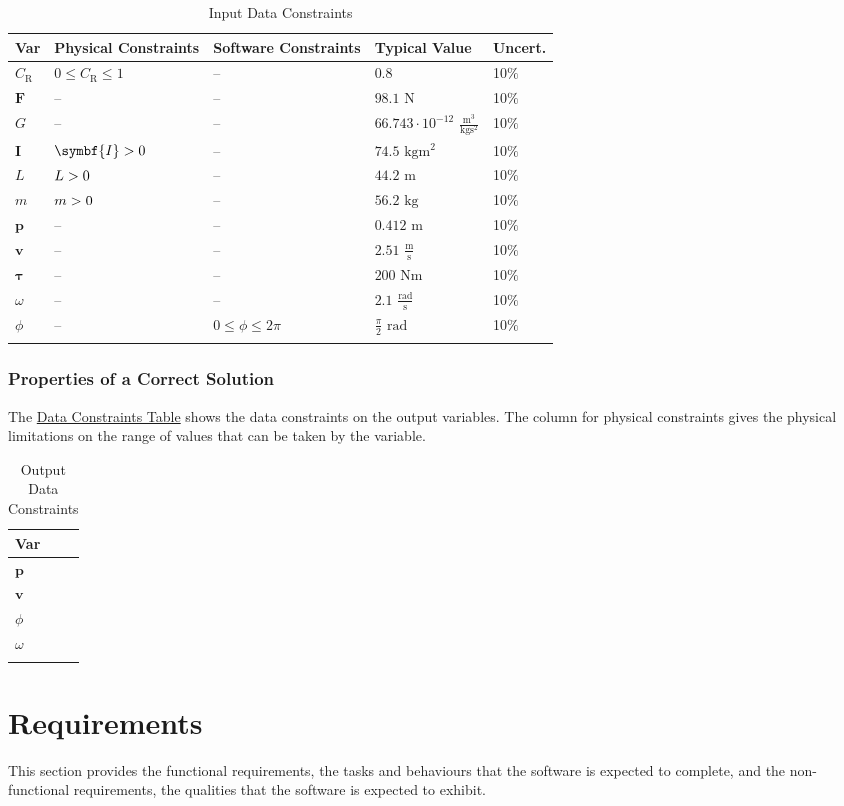 \documentclass[12pt]{article}
\newcommand{\gt}{\ensuremath >}
\begin{document}
\begin{longtable}{l l l l l}
\toprule
\textbf{Var} & \textbf{Physical Constraints} & \textbf{Software Constraints} & \textbf{Typical Value} & \textbf{Uncert.}
\\
\midrule
\endhead
${C_{\text{R}}}$ & $0\leq{}{C_{\text{R}}}\leq{}1$ & -- & $0.8$ & 10$\%$
\\
$\symbf{F}$ & -- & -- & $98.1$ ${\text{N}}$ & 10$\%$
\\
$G$ & -- & -- & $66.743\cdot{}10^{-12}$ $\frac{\text{m}^{3}}{\text{kg}\text{s}^{2}}$ & 10$\%$
\\
$\symbf{I}$ & $\symbf{I}\gt{}0$ & -- & $74.5$ $\text{kg}\text{m}^{2}$ & 10$\%$
\\
$L$ & $L\gt{}0$ & -- & $44.2$ ${\text{m}}$ & 10$\%$
\\
$m$ & $m\gt{}0$ & -- & $56.2$ ${\text{kg}}$ & 10$\%$
\\
$\symbf{p}$ & -- & -- & $0.412$ ${\text{m}}$ & 10$\%$
\\
$\symbf{v}$ & -- & -- & $2.51$ $\frac{\text{m}}{\text{s}}$ & 10$\%$
\\
$\symbf{τ}$ & -- & -- & $200$ $\text{N}\text{m}$ & 10$\%$
\\
$ω$ & -- & -- & $2.1$ $\frac{\text{rad}}{\text{s}}$ & 10$\%$
\\
$ϕ$ & -- & $0\leq{}ϕ\leq{}2 π$ & $\frac{π}{2}$ ${\text{rad}}$ & 10$\%$
\\
\bottomrule
\caption{Input Data Constraints}
\label{Table:InDataConstraints}
\end{longtable}
\subsubsection{Properties of a Correct Solution}
\label{Sec:CorSolProps}
The \hyperref[Table:OutDataConstraints]{Data Constraints Table} shows the data constraints on the output variables. The column for physical constraints gives the physical limitations on the range of values that can be taken by the variable.

\begin{longtable}{l}
\toprule
\textbf{Var}
\\
\midrule
\endhead
$\symbf{p}$
\\
$\symbf{v}$
\\
$ϕ$
\\
$ω$
\\
\bottomrule
\caption{Output Data Constraints}
\label{Table:OutDataConstraints}
\end{longtable}
\section{Requirements}
\label{Sec:Requirements}
This section provides the functional requirements, the tasks and behaviours that the software is expected to complete, and the non-functional requirements, the qualities that the software is expected to exhibit.
\end{document}
